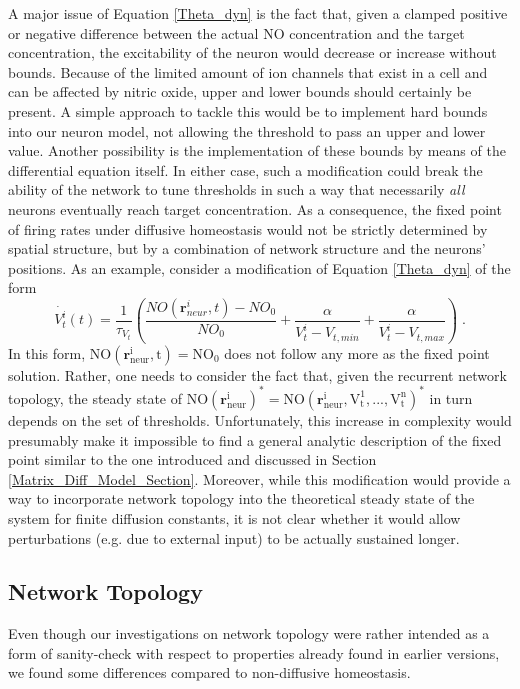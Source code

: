 \documentclass[10pt,a4paper]{article}
\begin{document}
A major issue of Equation \eqref{Theta_dyn} is the fact that, given a clamped positive or negative difference between the actual NO concentration and the target concentration, the excitability of the neuron would decrease or increase without bounds. Because of the limited amount of ion channels that exist in a cell and can be affected by nitric oxide, upper and lower bounds should certainly be present. A simple approach to tackle this would be to implement hard bounds into our neuron model, not allowing the threshold to pass an upper and lower value. Another possibility is the implementation of these bounds by means of the differential equation itself. In either case, such a modification could break the ability of the network to tune thresholds in such a way that necessarily \emph{all} neurons eventually reach target concentration. As a consequence, the fixed point of firing rates under diffusive homeostasis would not be strictly determined by spatial structure, but by a combination of network structure and the neurons' positions. As an example, consider a modification of Equation \eqref{Theta_dyn} of the form
\begin{equation}
\dot{V_t^i}(t) = \frac{1}{\tau_{V_t}}\left(\frac{NO(\mathbf{r}_{neur}^i,t)-NO_0}{NO_0} + \frac{\alpha}{V_t^i - V_{t,min}} + \frac{\alpha}{V_t^i - V_{t,max}}\right) \; .
\label{Theta_dyn_with_Bounds}
\end{equation}
In this form, $\mathrm{NO(\mathbf{r}_{neur}^i,t) = NO_0}$ does not follow any more as the fixed point solution. Rather, one needs to consider the fact that, given the recurrent network topology, the steady state of $\mathrm{NO(\mathbf{r}_{neur}^i)^* = NO(\mathbf{r}_{neur}^i,V_t^1,...,V_t^n)^*}$ in turn depends on the set of thresholds. Unfortunately, this increase in complexity would presumably make it impossible to find a general analytic description of the fixed point similar to the one introduced and discussed in Section \ref{Matrix_Diff_Model_Section}. Moreover, while this modification would provide a way to incorporate network topology into the theoretical steady state of the system for finite diffusion constants, it is not clear whether it would allow perturbations (e.g. due to external input) to be actually sustained longer.

\subsection{Network Topology} 
Even though our investigations on network topology were rather intended as a form of sanity-check with respect to properties already found in earlier versions, we found some differences compared to non-diffusive homeostasis.
\end{document}
